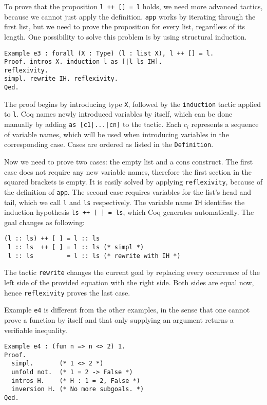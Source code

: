 \documentclass[fleqn]{scrreprt}
\newcommand{\coqinline}[1]{\texttt{#1}}
\begin{document}
\par
To prove that the proposition \coqinline{l ++ [] = l} holds, we need more advanced tactics, because we cannot just apply the definition. \coqinline{app} works by iterating through the first list, but we need to prove the proposition for every list, regardless of its length. One possibility to solve this problem is by using structural induction.
\begin{verbatim}
Example e3 : forall (X : Type) (l : list X), l ++ [] = l.
Proof. intros X. induction l as [|l ls IH].
reflexivity.
simpl. rewrite IH. reflexivity.
Qed.
\end{verbatim}
The proof begins by introducing type \coqinline{X}, followed by the \coqinline{induction} tactic applied to \coqinline{l}. Coq names newly introduced variables by itself, which can be done manually by adding \coqinline{as [c1|...|cn]} to the tactic. Each $c_{i}$ represents a sequence of variable names, which will be used when introducing variables in the corresponding case. Cases are ordered as listed in the \coqinline{Definition}.
\par
Now we need to prove two cases: the empty list and a cons construct. The first case does not require any new variable names, therefore the first section in the squared brackets is empty. It is easily solved by applying \coqinline{reflexivity}, because of the definition of \coqinline{app}.
The second case requires variables for the list's head and tail, which we call \coqinline{l} and \coqinline{ls} respectively. The variable name \coqinline{IH} identifies the induction hypothesis \coqinline{ls ++ [ ] = ls}, which Coq generates automatically. The goal changes as following:
\begin{verbatim}
(l :: ls) ++ [ ] = l :: ls
 l :: ls  ++ [ ] = l :: ls (* simpl *)
 l :: ls         = l :: ls (* rewrite with IH *)
\end{verbatim}
The tactic \coqinline{rewrite} changes the current goal by replacing every occurrence of the left side of the provided equation with the right side. Both sides are equal now, hence \coqinline{reflexivity} proves the last case.
\par 
Example \coqinline{e4} is different from the other examples, in the sense that one cannot prove a function by itself and that only supplying an argument returns a verifiable inequality. 
\begin{verbatim}
Example e4 : (fun n => n <> 2) 1.
Proof.
  simpl.       (* 1 <> 2 *)
  unfold not.  (* 1 = 2 -> False *)
  intros H.    (* H : 1 = 2, False *)
  inversion H. (* No more subgoals. *)
Qed.
\end{verbatim}
\end{document}
